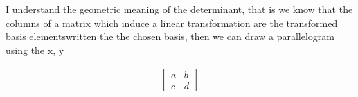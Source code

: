 \documentclass[11pt]{article}
\begin{document}
I understand the geometric meaning of the determinant, that is we know that the columns of a matrix which induce a linear transformation are the transformed basis elementswritten the the chosen basis, then we can draw a parallelogram using the x, y 

\begin{align*}
    \begin{bmatrix}
    	a &b  \\
    	c &d  
    \end{bmatrix}
\end{align*}
\end{document}
